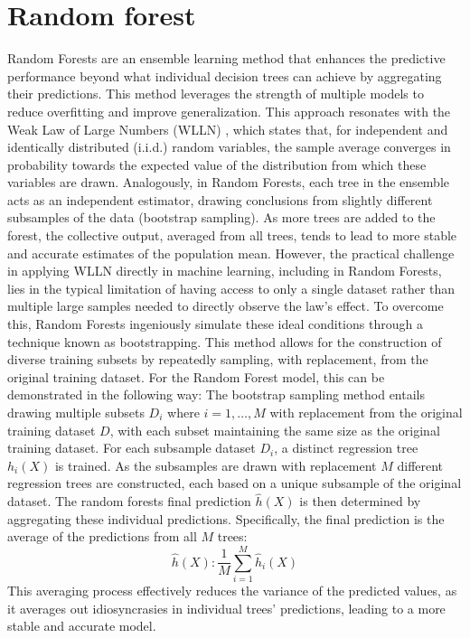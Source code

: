 \documentclass[12pt]{article}
\begin{document}
\section{Random forest}
Random Forests are an ensemble learning method that enhances the predictive performance beyond what individual decision trees can achieve by aggregating their predictions. This method leverages the strength of multiple models to reduce overfitting and improve generalization.
This approach resonates with the Weak Law of Large Numbers (WLLN) \cite{IBE2014185}, which states that, for independent and identically distributed (i.i.d.) random variables, the sample average converges in probability towards the expected value of the distribution from which these variables are drawn. 
Analogously, in Random Forests, each tree in the ensemble acts as an independent estimator, drawing conclusions from slightly different subsamples of the data (bootstrap sampling). As more trees are added to the forest, the collective output, averaged from all trees, tends to lead to more stable and accurate estimates of the population mean.
However, the practical challenge in applying WLLN directly in machine learning, including in Random Forests, lies in the typical limitation of having access to only a single dataset rather than multiple large samples needed to directly observe the law's effect. 
To overcome this, Random Forests ingeniously simulate these ideal conditions through a technique known as bootstrapping.
This method allows for the construction of diverse training subsets by repeatedly sampling, with replacement, from the original training dataset.
For the Random Forest model, this can be demonstrated in the following way: The bootstrap sampling method entails drawing multiple subsets $D_i$ where $i=1,\ldots,M$ with replacement from the original training dataset $D$, with each subset maintaining the same size as the original training dataset.
For each subsample dataset $D_i$, a distinct regression tree $h_i(X)$ is trained. 
As the subsamples are drawn with replacement $M$ different regression trees are constructed, each based on a unique subsample of the original dataset.
The random forests final prediction $\hat{h}(X)$ is then determined by aggregating these individual predictions. Specifically, the final prediction is the average of the predictions from all $M$ trees:
$$\hat{h}(X): \frac{1}{M} \sum_{i=1}^{M}\hat{h}_i(X)$$
This averaging process effectively reduces the variance of the predicted values, as it averages out idiosyncrasies in individual trees’ predictions, leading to a more stable and accurate model.
\end{document}
